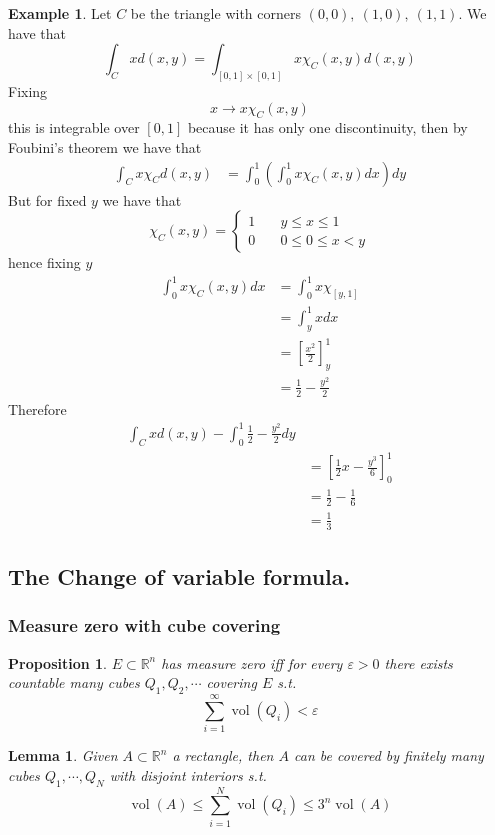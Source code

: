 \documentclass[11pt,a4paper]{article}
\theoremstyle{definition}
\newtheorem{example}[definition]{Example}
\theoremstyle{plain}
\newtheorem{lemma}[definition]{Lemma}
\newtheorem{proposition}[definition]{Proposition}
\theoremstyle{remark}
\newcommand{\R}{\mathbb{R}}
\newcommand{\vol}{\operatorname{vol}}
\begin{document}
\begin{example}
    Let $C$ be the triangle with corners $(0,0), \ (1, 0), \ (1,1)$. We have that 
    $$\int_C x d(x,y) = \int_{[0,1] \times [0,1]} x \chi_C (x,y) d(x,y)$$
    Fixing 
    $$x \to x \chi_C (x,y)$$
    this is integrable over $[0,1]$ because it has only one discontinuity, then by Foubini's theorem we have that 
    \begin{align*}
        \int_C x \chi_C d(x,y) &= \int_{0}^1 \left(\int_{0}^1 x \chi_C (x,y) dx\right)dy 
    \end{align*}
    But for fixed $y$ we have that 
    $$\chi_C (x,y) = \begin{cases}
        1 \quad&  y \le x \le 1\\
        0 \quad& 0 \le 0 \le x < y
    \end{cases}$$
    hence fixing $y$
    \begin{align*}
        \int_{0}^1 x \chi_C(x,y) dx  &= \int_{0}^1 x \chi_{[y,1]} \\
        &= \int_y^1 x dx \\
        &= [\frac{x^2}{2}]_y^1 \\
        &= \frac{1}{2} - \frac{y^2}{2}
    \end{align*}
    Therefore 
    \begin{align*}
        \int_C x d(x,y) - \int_0^1 \frac{1}{2} - \frac{y^2}{2} dy \\
        &= \left[\frac{1}{2}x - \frac{y^3}{6}\right]_0^1 \\
        &= \frac{1}{2} - \frac{1}{6} \\
        &= \frac{1}{3}
    \end{align*}
\end{example}

\subsection{The Change of variable formula.} 
\subsubsection{Measure zero with cube covering}
\begin{proposition}
    $E \subset \R^n$ has measure zero iff for every $\varepsilon > 0$ there exists countable many cubes $Q_1, Q_2, \cdots$ covering
    $E$ s.t. 
    $$\sum_{i=1}^\infty \vol (Q_i) < \varepsilon$$ 
\end{proposition}

 \begin{lemma}
    Given $A \subset \R^n$ a rectangle, then $A$ can be covered by finitely many cubes $Q_1, \cdots, Q_N$ with disjoint interiors 
    s.t. 
    $$\vol (A) \le \sum_{i=1}^N \vol (Q_i) \le 3^n \vol (A)$$
\end{lemma}
\end{document}
